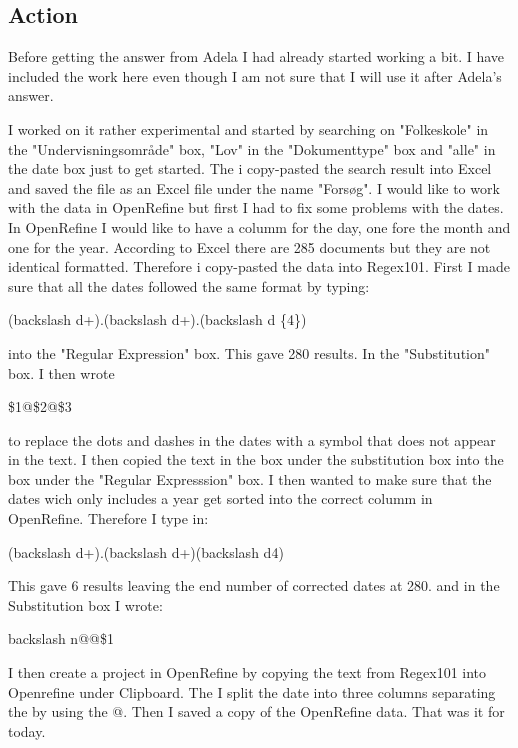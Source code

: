 \documentclass{article}
\begin{document}
\subsection{Action}
Before getting the answer from Adela I had already started working a bit. I have included the work here even though I am not sure that I will use it after Adela's answer.

I worked on it rather experimental and started by searching on "Folkeskole" in the "Undervisningsområde" box, "Lov" in the "Dokumenttype" box and "alle" in the date box just to get started. The i copy-pasted the search result into Excel and saved the file as an Excel file under the name "Forsøg". I would like to work with the data in OpenRefine but first I had to fix some problems with the dates. In OpenRefine I would like to have a columm for the day, one fore the month and one for the year. According to Excel there are 285 documents but they are not identical formatted. Therefore i copy-pasted the data into Regex101. First I made sure that all the dates followed the same format by typing:
\begin{center}
    (backslash d+).(backslash d+).(backslash d \{4\})
\end{center}
into the "Regular Expression" box. This gave 280 results. In the "Substitution" box. I then wrote
\begin{center}
    \$1@\$2@\$3 
\end{center}
to replace the dots and dashes in the dates with a symbol that does not appear in the text. I then copied the text in the box under the substitution box into the box under the "Regular Expresssion" box. I then wanted to make sure that the dates wich only includes a year get sorted into the correct columm in OpenRefine. Therefore I type in:
\begin{center}
    (backslash d+).(backslash d+)(backslash d{4})
\end{center}
This gave 6 results leaving the end number of corrected dates at 280.
and in the Substitution box I wrote: 
\begin{center}
    backslash n@@\$1
\end{center}
I then create a project in OpenRefine by copying the text from Regex101 into Openrefine under Clipboard. The I split the date into three columns separating the by using the @. Then I saved a copy of the OpenRefine data. That was it for today. \newline \vspace{2mm}
\end{document}
